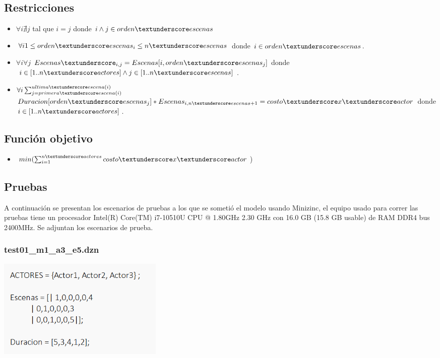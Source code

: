 \documentclass{article}
\begin{document}
\subsection{Restricciones}
\begin{itemize}
    \item $\forall i \nexists j$ tal que $i = j$ \newline donde $i \land j \in orden\textunderscore escenas$
    \item $\forall i 1 \leq orden\textunderscore escenas_i \leq n\textunderscore escenas$  donde $i \in orden\textunderscore escenas$.
    \item $\forall i \forall j$  $Escenas\textunderscore_{i,j} = Escenas[i,orden\textunderscore escenas_{j}]$ \newline donde $i \in [1..n\textunderscore actores] \land j \in [1..n\textunderscore escenas]$.
    \item $\forall i\sum_{j=primera\textunderscore escena(i)}^{ultima\textunderscore escena(i)}$  $Duracion[orden\textunderscore escenas_j] * Escenas_{i,n\textunderscore escenas+1} = costo\textunderscore x\textunderscore actor$\newline
          donde $i \in [1..n\textunderscore actores]$.
\end{itemize}

\subsection{Función objetivo}
\begin{itemize}
    \item $min(\sum_{i=1}^{n\textunderscore actores}costo\textunderscore x\textunderscore actor$)
\end{itemize}

\subsection{Pruebas}
A continuación se presentan los escenarios de pruebas a los que se sometió el modelo usando Minizinc, el equipo usado para correr las pruebas tiene un procesador Intel(R) Core(TM) i7-10510U CPU @ 1.80GHz   2.30 GHz con 16.0 GB (15.8 GB usable) de RAM DDR4 bus 2400MHz.\newline
Se adjuntan los escenarios de prueba.

\subsubsection{test01_m1_a3_e5.dzn}
\begin{center}
    \includegraphics[width=0.35\textwidth]{img/test01_m1.png}
\end{center}
\end{document}

